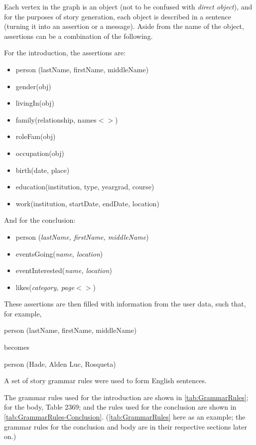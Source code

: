 Each vertex in the graph is an object (not to be confused with \textit{direct object}), and for the purposes of story generation, each object is described in a sentence (turning it into an assertion or a message). Aside from the name of the object, assertions can be a combination of the following.

For the introduction, the assertions are:
\begin{itemize}
	\item person (lastName, firstName, middleName)
	\item gender(obj)
	\item livingIn(obj)
	\item family(relationship, names$<$$>$)
	\item roleFam(obj)
	\item occupation(obj)
	\item birth(date, place)
	\item education(institution, type, yeargrad, course)
	\item work(institution, startDate, endDate, location)
\end{itemize}

And for the conclusion:
\begin{itemize}
	\item person (\textit{lastName, firstName, middleName})
	\item eventsGoing(\textit{name, location})
	\item eventInterested(\textit{name, location})
	\item likes(\textit{category, page$<$$>$})
\end{itemize}
These assertions are then filled with information from the user data, such that, for example,

\begin{center} person (lastName, firstName, middleName) \end{center}

becomes

\begin{center} person (Hade, Alden Luc, Rosqueta) \end{center}

A set of story grammar rules were used to form English sentences.

The grammar rules used for the introduction are shown in \ref{tab:GrammarRules}; for the body, Table 2369; and the rules used for the conclusion are shown in \ref{tab:GrammarRules-Conclusion}. (\ref{tab:GrammarRules} here as an example; the grammar rules for the conclusion and body are in their respective sections later on.)

